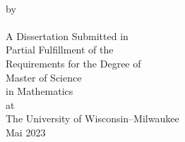 \begin{center}
{\Large \mytitle}
    \\
    \vspace{0.6\baselineskip}
    by\\
    \myauthor \\
    \vspace{2in}
    A Dissertation Submitted in\\
    Partial Fulfillment of the\\
    Requirements for the Degree of\\
    \vspace{0.5in}
    Master of Science\\
    in Mathematics\\
    \vspace{0.5in}
    at\\
    The University of Wisconsin--Milwaukee\\
    Mai 2023\\
\end{center}